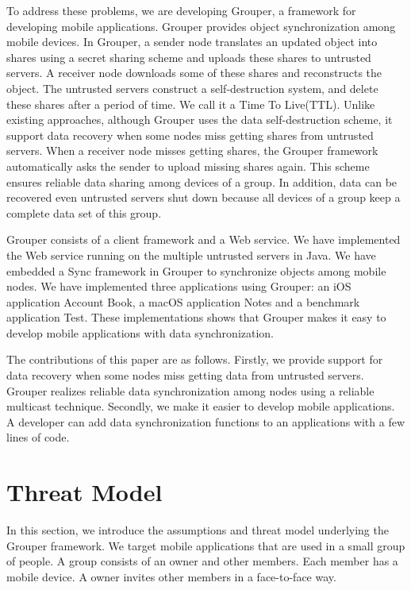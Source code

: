 \documentclass[twocolumn,10pt]{article}
\begin{document}
To address these problems, we are developing Grouper, a framework for developing mobile applications. 
Grouper provides object synchronization among mobile devices.
In Grouper, a sender node translates an updated object into shares using a secret sharing scheme and uploads these shares to untrusted servers. 
A receiver node downloads some of these shares and reconstructs the object.
The untrusted servers construct a self-destruction system, and delete these shares after a period of time.
We call it a Time To Live(TTL).
Unlike existing approaches, although Grouper uses the data self-destruction scheme, it support data recovery when some nodes miss getting shares from untrusted servers.
When a receiver node misses getting shares, the Grouper framework automatically asks the sender to upload missing shares again.
This scheme ensures reliable data sharing among devices of a group.
In addition, data can be recovered even untrusted servers shut down because all devices of a group keep a complete data set of this group.

Grouper consists of a client framework and a Web service.
We have implemented the Web service running on the multiple untrusted servers in Java. 
We have embedded a Sync framework in Grouper to synchronize objects among mobile nodes.
We have implemented three applications using Grouper: an iOS application Account Book, a macOS application Notes and a benchmark application Test.
These implementations shows that Grouper makes it easy to develop mobile applications with data synchronization.

The contributions of this paper are as follows.
Firstly, we provide support for data recovery when some nodes miss getting data from untrusted servers.
Grouper realizes reliable data synchronization among nodes using a reliable multicast technique.
Secondly, we make it easier to develop mobile applications.
A developer can add data synchronization functions to an applications with a few lines of code.

\section{Threat Model}

In this section, we introduce the assumptions and threat model underlying the Grouper framework.
We target mobile applications that are used in a small group of people.
A group consists of an owner and other members.
Each member has a mobile device.
A owner invites other members in a face-to-face way.
\end{document}
